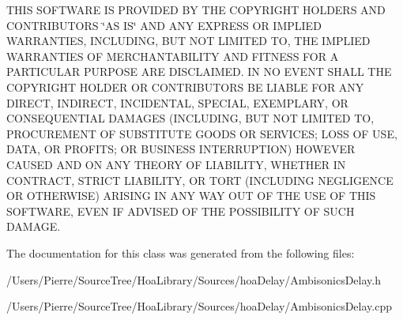 T\-H\-I\-S S\-O\-F\-T\-W\-A\-R\-E I\-S P\-R\-O\-V\-I\-D\-E\-D B\-Y T\-H\-E C\-O\-P\-Y\-R\-I\-G\-H\-T H\-O\-L\-D\-E\-R\-S A\-N\-D C\-O\-N\-T\-R\-I\-B\-U\-T\-O\-R\-S \char`\"{}\-A\-S I\-S\char`\"{} A\-N\-D A\-N\-Y E\-X\-P\-R\-E\-S\-S O\-R I\-M\-P\-L\-I\-E\-D W\-A\-R\-R\-A\-N\-T\-I\-E\-S, I\-N\-C\-L\-U\-D\-I\-N\-G, B\-U\-T N\-O\-T L\-I\-M\-I\-T\-E\-D T\-O, T\-H\-E I\-M\-P\-L\-I\-E\-D W\-A\-R\-R\-A\-N\-T\-I\-E\-S O\-F M\-E\-R\-C\-H\-A\-N\-T\-A\-B\-I\-L\-I\-T\-Y A\-N\-D F\-I\-T\-N\-E\-S\-S F\-O\-R A P\-A\-R\-T\-I\-C\-U\-L\-A\-R P\-U\-R\-P\-O\-S\-E A\-R\-E D\-I\-S\-C\-L\-A\-I\-M\-E\-D. I\-N N\-O E\-V\-E\-N\-T S\-H\-A\-L\-L T\-H\-E C\-O\-P\-Y\-R\-I\-G\-H\-T H\-O\-L\-D\-E\-R O\-R C\-O\-N\-T\-R\-I\-B\-U\-T\-O\-R\-S B\-E L\-I\-A\-B\-L\-E F\-O\-R A\-N\-Y D\-I\-R\-E\-C\-T, I\-N\-D\-I\-R\-E\-C\-T, I\-N\-C\-I\-D\-E\-N\-T\-A\-L, S\-P\-E\-C\-I\-A\-L, E\-X\-E\-M\-P\-L\-A\-R\-Y, O\-R C\-O\-N\-S\-E\-Q\-U\-E\-N\-T\-I\-A\-L D\-A\-M\-A\-G\-E\-S (I\-N\-C\-L\-U\-D\-I\-N\-G, B\-U\-T N\-O\-T L\-I\-M\-I\-T\-E\-D T\-O, P\-R\-O\-C\-U\-R\-E\-M\-E\-N\-T O\-F S\-U\-B\-S\-T\-I\-T\-U\-T\-E G\-O\-O\-D\-S O\-R S\-E\-R\-V\-I\-C\-E\-S; L\-O\-S\-S O\-F U\-S\-E, D\-A\-T\-A, O\-R P\-R\-O\-F\-I\-T\-S; O\-R B\-U\-S\-I\-N\-E\-S\-S I\-N\-T\-E\-R\-R\-U\-P\-T\-I\-O\-N) H\-O\-W\-E\-V\-E\-R C\-A\-U\-S\-E\-D A\-N\-D O\-N A\-N\-Y T\-H\-E\-O\-R\-Y O\-F L\-I\-A\-B\-I\-L\-I\-T\-Y, W\-H\-E\-T\-H\-E\-R I\-N C\-O\-N\-T\-R\-A\-C\-T, S\-T\-R\-I\-C\-T L\-I\-A\-B\-I\-L\-I\-T\-Y, O\-R T\-O\-R\-T (I\-N\-C\-L\-U\-D\-I\-N\-G N\-E\-G\-L\-I\-G\-E\-N\-C\-E O\-R O\-T\-H\-E\-R\-W\-I\-S\-E) A\-R\-I\-S\-I\-N\-G I\-N A\-N\-Y W\-A\-Y O\-U\-T O\-F T\-H\-E U\-S\-E O\-F T\-H\-I\-S S\-O\-F\-T\-W\-A\-R\-E, E\-V\-E\-N I\-F A\-D\-V\-I\-S\-E\-D O\-F T\-H\-E P\-O\-S\-S\-I\-B\-I\-L\-I\-T\-Y O\-F S\-U\-C\-H D\-A\-M\-A\-G\-E. 

The documentation for this class was generated from the following files\-:\begin{DoxyCompactItemize}
\item 
/\-Users/\-Pierre/\-Source\-Tree/\-Hoa\-Library/\-Sources/hoa\-Delay/Ambisonics\-Delay.\-h\item 
/\-Users/\-Pierre/\-Source\-Tree/\-Hoa\-Library/\-Sources/hoa\-Delay/Ambisonics\-Delay.\-cpp\end{DoxyCompactItemize}
